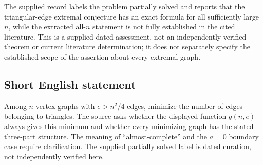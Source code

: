 \documentclass[11pt]{article}
\begin{document}
The supplied record labels the problem partially solved and reports that the triangular-edge extremal conjecture has an exact formula for all sufficiently large \(n\), while the extracted all-\(n\) statement is not fully established in the cited literature. This is a supplied dated assessment, not an independently verified theorem or current literature determination; it does not separately specify the established scope of the assertion about every extremal graph.
\subsection{Short English statement}
Among \(n\)-vertex graphs with \(e>n^2/4\) edges, minimize the number of edges belonging to triangles. The source asks whether the displayed function \(g(n,e)\) always gives this minimum and whether every minimizing graph has the stated three-part structure. The meaning of ``almost-complete'' and the \(a=0\) boundary case require clarification. The supplied partially solved label is dated curation, not independently verified here.
\end{document}

